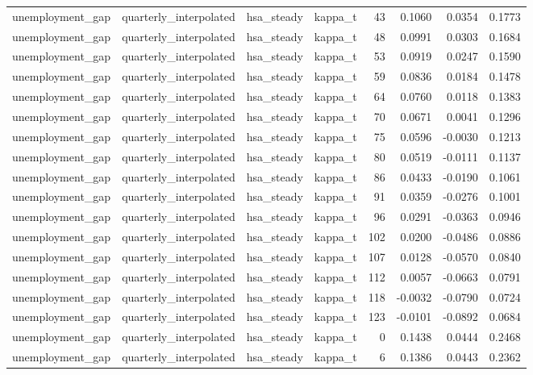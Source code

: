 \begin{tabular}{llllrrrr}
unemployment\_gap & quarterly\_interpolated & hsa\_steady & kappa\_t & 43 & 0.1060 & 0.0354 & 0.1773 \\
unemployment\_gap & quarterly\_interpolated & hsa\_steady & kappa\_t & 48 & 0.0991 & 0.0303 & 0.1684 \\
unemployment\_gap & quarterly\_interpolated & hsa\_steady & kappa\_t & 53 & 0.0919 & 0.0247 & 0.1590 \\
unemployment\_gap & quarterly\_interpolated & hsa\_steady & kappa\_t & 59 & 0.0836 & 0.0184 & 0.1478 \\
unemployment\_gap & quarterly\_interpolated & hsa\_steady & kappa\_t & 64 & 0.0760 & 0.0118 & 0.1383 \\
unemployment\_gap & quarterly\_interpolated & hsa\_steady & kappa\_t & 70 & 0.0671 & 0.0041 & 0.1296 \\
unemployment\_gap & quarterly\_interpolated & hsa\_steady & kappa\_t & 75 & 0.0596 & -0.0030 & 0.1213 \\
unemployment\_gap & quarterly\_interpolated & hsa\_steady & kappa\_t & 80 & 0.0519 & -0.0111 & 0.1137 \\
unemployment\_gap & quarterly\_interpolated & hsa\_steady & kappa\_t & 86 & 0.0433 & -0.0190 & 0.1061 \\
unemployment\_gap & quarterly\_interpolated & hsa\_steady & kappa\_t & 91 & 0.0359 & -0.0276 & 0.1001 \\
unemployment\_gap & quarterly\_interpolated & hsa\_steady & kappa\_t & 96 & 0.0291 & -0.0363 & 0.0946 \\
unemployment\_gap & quarterly\_interpolated & hsa\_steady & kappa\_t & 102 & 0.0200 & -0.0486 & 0.0886 \\
unemployment\_gap & quarterly\_interpolated & hsa\_steady & kappa\_t & 107 & 0.0128 & -0.0570 & 0.0840 \\
unemployment\_gap & quarterly\_interpolated & hsa\_steady & kappa\_t & 112 & 0.0057 & -0.0663 & 0.0791 \\
unemployment\_gap & quarterly\_interpolated & hsa\_steady & kappa\_t & 118 & -0.0032 & -0.0790 & 0.0724 \\
unemployment\_gap & quarterly\_interpolated & hsa\_steady & kappa\_t & 123 & -0.0101 & -0.0892 & 0.0684 \\
unemployment\_gap & quarterly\_interpolated & hsa\_steady & kappa\_t & 0 & 0.1438 & 0.0444 & 0.2468 \\
unemployment\_gap & quarterly\_interpolated & hsa\_steady & kappa\_t & 6 & 0.1386 & 0.0443 & 0.2362 \\

\end{tabular}
